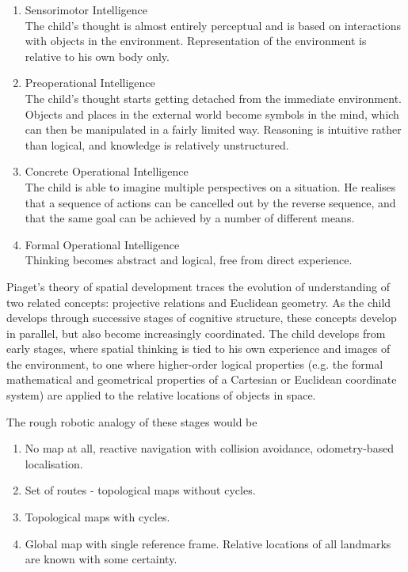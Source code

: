 \begin{enumerate}
\item Sensorimotor Intelligence\\
   The child's thought is almost entirely perceptual and is based on 
   interactions with objects in the environment. Representation of the
   environment is relative to his own body only.

\item Preoperational Intelligence\\
   The child's thought starts getting detached from the immediate
   environment. Objects and places in the external world become
   symbols in the mind, which can then be manipulated in a fairly
   limited way. Reasoning is intuitive rather than logical, and
   knowledge is relatively unstructured.

\item Concrete Operational Intelligence\\ 
    The child is able to imagine multiple perspectives on a situation.
    He realises that a sequence of actions can be cancelled out by
    the reverse sequence, and that the same goal can be achieved by a
    number of different means.

\item Formal Operational Intelligence\\
    Thinking becomes abstract and logical, free from direct experience.


\end{enumerate}

Piaget's theory of spatial development traces the evolution of
understanding of two related concepts: projective relations and
Euclidean geometry. As the child develops through successive stages of
cognitive structure, these concepts develop in parallel, but also
become increasingly coordinated. The child develops from early stages,
where spatial thinking is tied to his own experience and images of
the environment, to one where higher-order logical properties
(e.g. the formal mathematical and geometrical properties of a
Cartesian or Euclidean coordinate system) are applied to the relative
locations of objects in space.

The rough robotic analogy of these stages would be
\begin{enumerate}

\item No map at all, reactive navigation with collision avoidance,
  odometry-based localisation.

\item Set of routes - topological maps without cycles.

\item Topological maps with cycles.

\item Global map with single reference frame. Relative locations of
  all landmarks are known with some certainty.
\end{enumerate}

